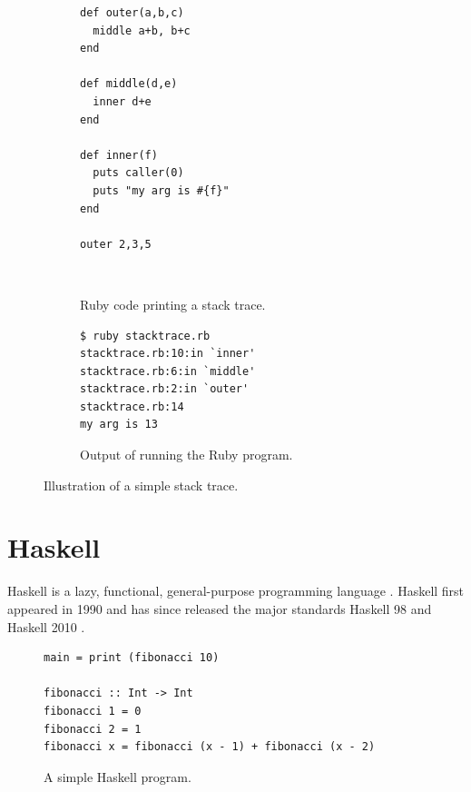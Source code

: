 \begin{figure}
\begin{mdframed}
  \begin{subfigure}[t]{0.5\textwidth}
      \begin{verbatim}
def outer(a,b,c)
  middle a+b, b+c
end

def middle(d,e)
  inner d+e
end

def inner(f)
  puts caller(0)
  puts "my arg is #{f}"
end

outer 2,3,5
       \end{verbatim}
    \caption{Ruby code printing a stack trace.}
    ~ %
  \end{subfigure}
        \begin{subfigure}[t]{0.5\textwidth}
          \begin{verbatim}
$ ruby stacktrace.rb
stacktrace.rb:10:in `inner'
stacktrace.rb:6:in `middle'
stacktrace.rb:2:in `outer'
stacktrace.rb:14
my arg is 13
          \end{verbatim}
          \caption{Output of running the Ruby program.}
        \end{subfigure}
        \caption{Illustration of a simple stack trace.}
        \label{fig:ruby_stack_trace}
\end{mdframed}
\end{figure}

\section{Haskell} \label{sec:haskell}

Haskell is a lazy, functional, general-purpose programming language \cite{haskell_report2010}.
Haskell first appeared in 1990 \cite{HistoryOfHaskell2007} and has since
released the major standards Haskell 98 and Haskell 2010
\cite{haskell_report2010}.

\begin{figure}
\begin{mdframed}
  \begin{verbatim}
main = print (fibonacci 10)

fibonacci :: Int -> Int
fibonacci 1 = 0
fibonacci 2 = 1
fibonacci x = fibonacci (x - 1) + fibonacci (x - 2)
  \end{verbatim}
  \caption{A simple Haskell program.}
  \label{fig:simple_program}
\end{mdframed}
\end{figure}


